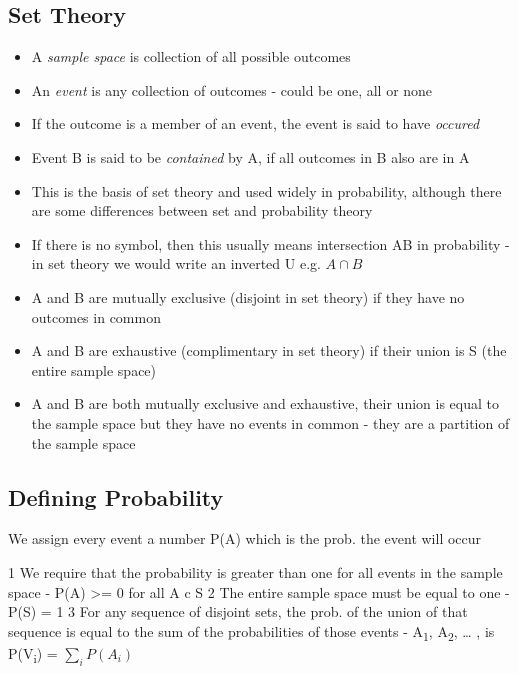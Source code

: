 \documentclass[]{book}
\theoremstyle{definition}
\theoremstyle{definition}
\theoremstyle{definition}
\theoremstyle{remark}
\begin{document}
\subsection{Set Theory}\label{set-theory}

\begin{itemize}
\item
  A \emph{sample space} is collection of all possible outcomes
\item
  An \emph{event} is any collection of outcomes - could be one, all or
  none
\item
  If the outcome is a member of an event, the event is said to have
  \emph{occured}
\item
  Event B is said to be \emph{contained} by A, if all outcomes in B also
  are in A
\item
  This is the basis of set theory and used widely in probability,
  although there are some differences between set and probability theory
\item
  If there is no symbol, then this usually means intersection AB in
  probability - in set theory we would write an inverted U e.g.
  \(A \cap B\)
\item
  A and B are mutually exclusive (disjoint in set theory) if they have
  no outcomes in common
\item
  A and B are exhaustive (complimentary in set theory) if their union is
  S (the entire sample space)
\item
  A and B are both mutually exclusive and exhaustive, their union is
  equal to the sample space but they have no events in common - they are
  a partition of the sample space
\end{itemize}

\subsection{Defining Probability}\label{defining-probability}

We assign every event a number P(A) which is the prob. the event will
occur

1 We require that the probability is greater than one for all events in
the sample space - P(A) \textgreater{}= 0 for all A c S 2 The entire
sample space must be equal to one - P(S) = 1 3 For any sequence of
disjoint sets, the prob. of the union of that sequence is equal to the
sum of the probabilities of those events - A\textsubscript{1},
A\textsubscript{2}, \ldots{} , is P(V\textsubscript{i}) =
\(\sum_{i} P(A_i)\)
\end{document}
